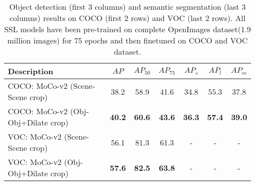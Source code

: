 \begin{table*}
    \centering
    \begin{tabu} to \linewidth {lcccccc} 
        \toprule
        Description & $AP$ & $AP_{50}$ & $AP_{75}$ & $AP_{s}$ & $AP_{l}$ & $AP_{m}$ \\
        
    
     \midrule
    COCO: MoCo-v2 (Scene-Scene crop) & 38.2 & 58.9 & 41.6 & 34.8 & 55.3 & 37.8\\
    
   
   
    COCO: MoCo-v2 (Obj-Obj+Dilate crop)  & \textbf{40.2} & \textbf{60.6} & \textbf{43.6} & \textbf{36.3} & \textbf{57.4} & \textbf{39.0}\\
    \midrule
    VOC: MoCo-v2 (Scene-Scene crop) & 56.1 & 81.3 & 61.3 & - & - & -\\
    VOC: MoCo-v2 (Obj-Obj+Dilate crop)  &  \textbf{57.6} &  \textbf{82.5} & \textbf{63.8} & - & - & -\\
        \bottomrule
    \end{tabu}
    \caption{Object detection (first 3 columns) and semantic segmentation (last 3 columns) results on COCO (first 2 rows) and VOC (last 2 rows). All SSL models have been pre-trained on complete OpenImages dataset(1.9 million images) for 75 epochs and then finetuned on COCO and VOC dataset.}
    \label{tab:openimages_full_results}
\end{table*}

